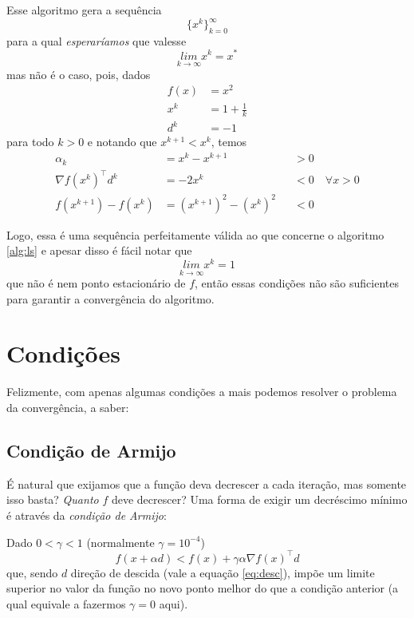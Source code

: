 \documentclass[a4paper,11pt]{article}
\begin{document}
        Esse algoritmo gera a sequência
            $$ \{x^k\}_{k = 0}^\infty $$
        para a qual \emph{esperaríamos} que valesse
            $$ \underset{k \rightarrow \infty}{lim} x^k = x^*$$
        mas não é o caso, pois, dados
            \begin{align*}
                f(x) &= {x}^2 \\
                x^k  &= 1 + \frac{1}{k} \\
                d^k  &= -1
            \end{align*}
        para todo $k > 0$ e notando que $x^{k+1} < x^{k}$, temos
        \begin{align*}
            \alpha_k &= x^k - x^{k+1}  & &> 0 \\
            \nabla f(x^k)^\top d^k &= -2x^k & &< 0 \quad \forall x > 0 \\
            f(x^{k+1}) - f(x^k) &= (x^{k+1})^2 - (x^{k})^2 & &< 0
        \end{align*}

        Logo, essa é uma sequência perfeitamente válida ao que concerne o algoritmo \ref{alg:ls} e apesar disso é fácil notar que
            $$ \underset{k \rightarrow \infty}{lim} x^k = 1$$
        que não é nem ponto estacionário de $f$, então essas condições não são suficientes para garantir a convergência do algoritmo.
    \section*{Condições}
        Felizmente, com apenas algumas condições a mais podemos resolver o problema da convergência, a saber:

        \subsection*{Condição de Armijo}
            É natural que exijamos que a função deva decrescer a cada iteração, mas somente isso basta? \emph{Quanto} $f$
            deve decrescer? Uma forma de exigir um decréscimo mínimo é através da \emph{condição de Armijo}:

            Dado $0 < \gamma < 1$ (normalmente $\gamma = 10^{-4}$)
                $$ f(x + \alpha d) < f(x) + \gamma \alpha \nabla f(x)^\top d $$
            que, sendo $d$ direção de descida (vale a equação \ref{eq:desc}), impõe um limite superior no valor da função
            no novo ponto melhor do que a condição anterior (a qual equivale a fazermos $\gamma = 0$ aqui).
\end{document}
